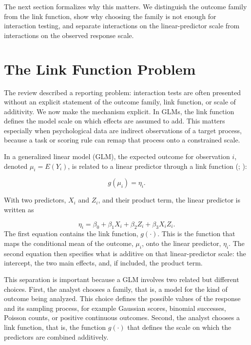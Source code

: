\documentclass[
  man,
  longtable,
  nolmodern,
  notxfonts,
  notimes,
  colorlinks=true,linkcolor=blue,citecolor=blue,urlcolor=blue]{apa7}
\begin{document}
The next section formalizes why this matters. We distinguish the outcome
family from the link function, show why choosing the family is not
enough for interaction testing, and separate interactions on the
linear-predictor scale from interactions on the observed response scale.

\section{The Link Function Problem}\label{the-link-function-problem}

The review described a reporting problem: interaction tests are often
presented without an explicit statement of the outcome family, link
function, or scale of additivity. We now make the mechanism explicit. In
GLMs, the link function defines the model scale on which effects are
assumed to add. This matters especially when psychological data are
indirect observations of a target process, because a task or scoring
rule can remap that process onto a constrained scale.

In a generalized linear model (GLM), the expected outcome for
observation \(i\), denoted \(\mu_i = E(Y_i)\), is related to a linear
predictor through a link function
(;
):

\[
g(\mu_i) = \eta_i.
\]

With two predictors, \(X_i\) and \(Z_i\), and their product term, the
linear predictor is written as

\[
\eta_i = \beta_0 + \beta_1 X_i + \beta_2 Z_i + \beta_3 X_i Z_i.
\] The first equation contains the link function, \(g(\cdot)\). This is
the function that maps the conditional mean of the outcome, \(\mu_i\),
onto the linear predictor, \(\eta_i\). The second equation then
specifies what is additive on that linear-predictor scale: the
intercept, the two main effects, and, if included, the product term.

This separation is important because a GLM involves two related but
different choices. First, the analyst chooses a family, that is, a model
for the kind of outcome being analyzed. This choice defines the possible
values of the response and its sampling process, for example Gaussian
scores, binomial successes, Poisson counts, or positive continuous
outcomes. Second, the analyst chooses a link function, that is, the
function \(g(\cdot)\) that defines the scale on which the predictors are
combined additively.
\end{document}
